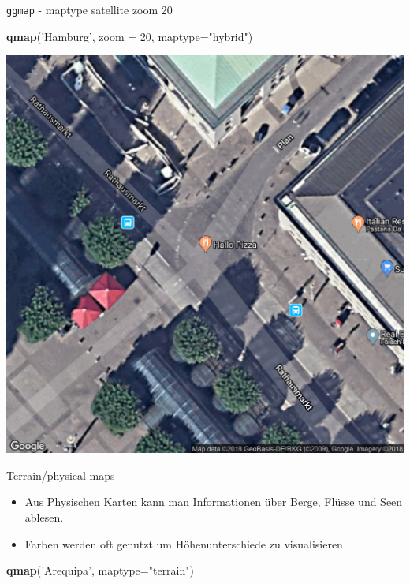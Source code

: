 \documentclass[ignorenonframetext,]{beamer}
\newenvironment{Shaded}{\begin{snugshade}}{\end{snugshade}}
\newcommand{\DataTypeTok}[1]{\textcolor[rgb]{0.13,0.29,0.53}{#1}}
\newcommand{\DecValTok}[1]{\textcolor[rgb]{0.00,0.00,0.81}{#1}}
\newcommand{\KeywordTok}[1]{\textcolor[rgb]{0.13,0.29,0.53}{\textbf{#1}}}
\newcommand{\NormalTok}[1]{#1}
\newcommand{\StringTok}[1]{\textcolor[rgb]{0.31,0.60,0.02}{#1}}
\begin{document}
\begin{frame}[fragile]{\texttt{ggmap} - maptype satellite zoom 20}
\protect\hypertarget{ggmap---maptype-satellite-zoom-20}{}

\begin{Shaded}
\begin{Highlighting}[]
\KeywordTok{qmap}\NormalTok{(}\StringTok{'Hamburg'}\NormalTok{, }\DataTypeTok{zoom =} \DecValTok{20}\NormalTok{, }\DataTypeTok{maptype=}\StringTok{"hybrid"}\NormalTok{)}
\end{Highlighting}
\end{Shaded}

\includegraphics{figure/ham_map.pdf}

\end{frame}

\begin{frame}[fragile]{Terrain/physical maps}
\protect\hypertarget{terrainphysical-maps}{}

\begin{itemize}
\item
  Aus Physischen Karten kann man Informationen über Berge, Flüsse und
  Seen ablesen.
\item
  Farben werden oft genutzt um Höhenunterschiede zu visualisieren
\end{itemize}

\begin{Shaded}
\begin{Highlighting}[]
\KeywordTok{qmap}\NormalTok{(}\StringTok{'Arequipa'}\NormalTok{, }\DataTypeTok{maptype=}\StringTok{"terrain"}\NormalTok{)}
\end{Highlighting}
\end{Shaded}

\end{frame}
\end{document}
